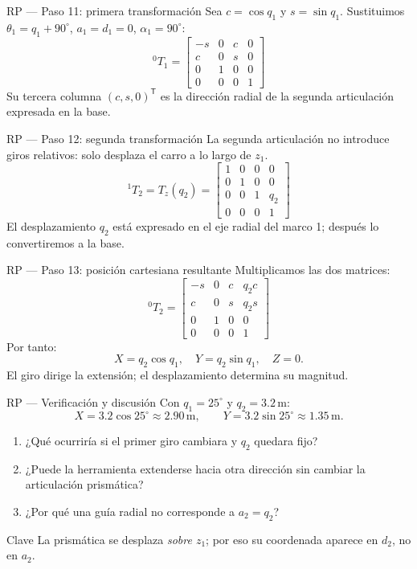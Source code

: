 \documentclass[aspectratio=169,11pt]{beamer}
\begin{document}
\begin{frame}[t]{RP — Paso 11: primera transformación}
 \small
 Sea $c=\cos q_1$ y $s=\sin q_1$.
 Sustituimos $\theta_1=q_1+90^\circ$, $a_1=d_1=0$,
 $\alpha_1=90^\circ$:
 \[
 \boxed{{}^0T_1=
 \begin{bmatrix}
 -s&0&c&0\\
 c&0&s&0\\
 0&1&0&0\\
 0&0&0&1
 \end{bmatrix}}
 \]
 \pause
 \small Su tercera columna $(c,s,0)^{\mathsf T}$ es la dirección
 radial de la segunda articulación expresada en la base.
\end{frame}

\begin{frame}[t]{RP — Paso 12: segunda transformación}
 \small
 La segunda articulación no introduce giros relativos:
 solo desplaza el carro a lo largo de $z_1$.
 \[
 \boxed{{}^1T_2=T_z(q_2)=
 \begin{bmatrix}
 1&0&0&0\\
 0&1&0&0\\
 0&0&1&q_2\\
 0&0&0&1
 \end{bmatrix}}
 \]
 \pause
 \small El desplazamiento $q_2$ está expresado en el eje
 radial del marco 1; después lo convertiremos a la base.
\end{frame}

\begin{frame}[t]{RP — Paso 13: posición cartesiana resultante}
 \small
 Multiplicamos las dos matrices:
 \[
 \boxed{{}^0T_2=
 \begin{bmatrix}
 -s&0&c&q_2c\\
 c&0&s&q_2s\\
 0&1&0&0\\
 0&0&0&1
 \end{bmatrix}}
 \]
 \pause
 Por tanto:
 \[
 \boxed{X=q_2\cos q_1,\quad Y=q_2\sin q_1,\quad Z=0.}
 \]
 \small El giro dirige la extensión; el desplazamiento determina su magnitud.
\end{frame}

\begin{frame}[t]{RP — Verificación y discusión}
 \small
 Con $q_1=25^\circ$ y $q_2=3.2\,\mathrm m$:
 \[
 X=3.2\cos25^\circ\approx2.90\,\mathrm m,\qquad
 Y=3.2\sin25^\circ\approx1.35\,\mathrm m.
 \]
 \pause
 \begin{enumerate}
  \item ¿Qué ocurriría si el primer giro cambiara y $q_2$ quedara fijo?
  \item ¿Puede la herramienta extenderse hacia otra dirección
  sin cambiar la articulación prismática?
  \item ¿Por qué una guía radial no corresponde a $a_2=q_2$?
 \end{enumerate}
 \begin{block}{Clave}
 La prismática se desplaza \emph{sobre $z_1$};
 por eso su coordenada aparece en $d_2$, no en $a_2$.
 \end{block}
\end{frame}
\end{document}
